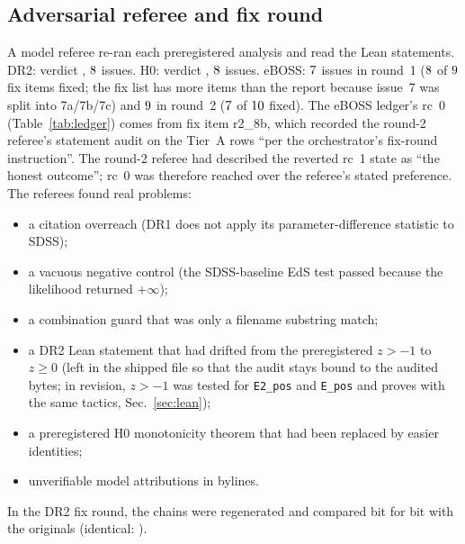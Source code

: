 \documentclass[11pt]{article}
\begin{document}
\subsection{Adversarial referee and fix round}\label{sec:referee}
A model referee re-ran each preregistered analysis and read the Lean statements. DR2: verdict \dTwoRefVerdict{}, $8$ issues. H0: verdict
\hzRefVerdict{}, $8$ issues. eBOSS: $7$ issues in round~1 ($8$ of $9$ fix items fixed; the fix list has more items than
the report because issue~7 was split into 7a/7b/7c) and $9$ in round~2 ($7$ of $10$ fixed). The eBOSS ledger's rc~0
(Table~\ref{tab:ledger}) comes from fix item r2\_8b, which recorded the round-2 referee's statement audit on the Tier~A rows ``per the orchestrator's
fix-round instruction''. The round-2 referee had described the reverted rc~1 state as ``the honest outcome''; rc~0 was therefore reached over the
referee's stated preference. The referees found real problems:
\begin{itemize}
\item a citation overreach (DR1 does not apply its parameter-difference statistic to SDSS);
\item a vacuous negative control (the SDSS-baseline EdS test passed because the likelihood returned $+\infty$);
\item a combination guard that was only a filename substring match;
\item a DR2 Lean statement that had drifted from the preregistered $z>-1$ to $z\ge0$ (left in the shipped file so that the audit stays bound to the
audited bytes; in revision, $z>-1$ was tested for \texttt{E2\_pos} and \texttt{E\_pos} and proves with the same tactics, Sec.~\ref{sec:lean});
\item a preregistered H0 monotonicity theorem that had been replaced by easier identities;
\item unverifiable model attributions in bylines.
\end{itemize}
In the DR2 fix round, the chains were regenerated and compared bit for bit with the originals (identical: \dTwoRerunIdentical).
\end{document}
